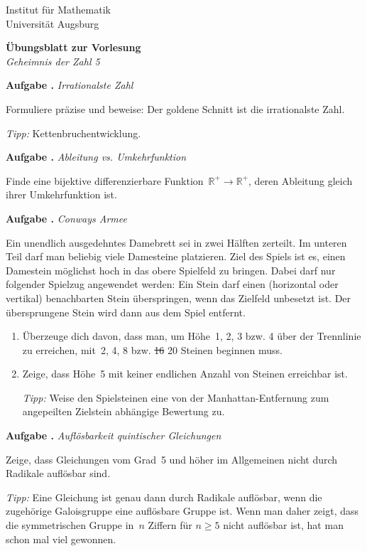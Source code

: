 \documentclass[a4paper,ngerman]{scrartcl}
\newlength{\aufgabenskip}
\newcounter{aufgabennummer}
\newenvironment{aufgabe}[1]{
  \addtocounter{aufgabennummer}{1}
  \textbf{Aufgabe \theaufgabennummer.} \emph{#1} \par
}{\vspace{\aufgabenskip}}
\newcommand{\RR}{\mathbb{R}}
\begin{document}
Institut für Mathematik \\
Universität Augsburg

\begin{center}
  \textbf{Übungsblatt zur Vorlesung} \\
  \emph{Geheimnis der Zahl 5}
\end{center}
\vspace{1em}

\begin{aufgabe}{Irrationalste Zahl}
Formuliere präzise und beweise: Der goldene Schnitt ist die irrationalste Zahl.

\emph{Tipp:} Kettenbruchentwicklung.
\end{aufgabe}

\begin{aufgabe}{Ableitung vs. Umkehrfunktion}
Finde eine bijektive differenzierbare Funktion~$\RR^+ \to \RR^+$, deren
Ableitung gleich ihrer Umkehrfunktion ist.
\end{aufgabe}

\begin{aufgabe}{Conways Armee}
Ein unendlich ausgedehntes Damebrett sei in zwei Hälften zerteilt. Im unteren
Teil darf man beliebig viele Damesteine platzieren. Ziel des Spiels ist es,
einen Damestein möglichst hoch in das obere Spielfeld zu
bringen. Dabei darf nur folgender Spielzug angewendet werden: Ein Stein
darf einen (horizontal oder vertikal) benachbarten Stein überspringen, wenn das
Zielfeld unbesetzt ist. Der übersprungene Stein wird dann aus dem Spiel
entfernt.
\begin{enumerate}
\item Überzeuge dich davon, dass man, um Höhe~1, 2, 3 bzw. 4 über der
Trennlinie zu erreichen, mit~2, 4, 8 bzw. \sout{16} 20 Steinen beginnen muss.
\item Zeige, dass Höhe~5 mit keiner endlichen Anzahl von Steinen erreichbar
ist.

\emph{Tipp:} Weise den Spielsteinen eine von der Manhattan-Entfernung zum
angepeilten Zielstein abhängige Bewertung zu.
\end{enumerate}
\end{aufgabe}

\begin{aufgabe}{Auflösbarkeit quintischer Gleichungen}
Zeige, dass Gleichungen vom Grad~5 und höher im Allgemeinen nicht durch
Radikale auflösbar sind.

\emph{Tipp:} Eine Gleichung ist genau dann durch Radikale auflösbar, wenn die
zugehörige Galoisgruppe eine auflösbare Gruppe ist. Wenn man daher zeigt, dass
die symmetrischen Gruppe in~$n$ Ziffern für $n \geq 5$ nicht auflösbar ist, hat
man schon mal viel gewonnen.
\end{aufgabe}
\end{document}
